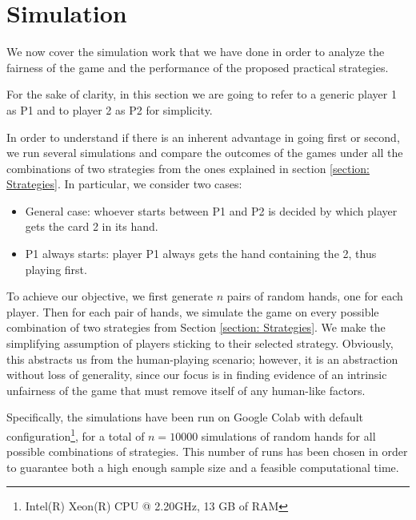 \section{Simulation}\label{section:Simulation}
We now cover the simulation work that we have done in order to analyze the fairness of the game and the performance of the proposed practical strategies.

For the sake of clarity, in this section we are going to refer to a generic player 1 as P1 and to player 2 as P2 for simplicity.

In order to understand if there is an inherent advantage in going first or second, we run several simulations and compare the outcomes of the games under all the combinations of two strategies from the ones explained in section \ref{section: Strategies}. In particular, we consider two cases:
\begin{itemize}
	\item General case: whoever starts between P1 and P2 is decided by which player gets the card 2 in its hand.
	\item P1 always starts: player P1 always gets the hand containing the 2, thus playing first.
\end{itemize}
To achieve our objective, we first generate $n$ pairs of random hands, one for each player. Then for each pair of hands, we simulate the game on every possible combination of two strategies from Section \ref{section: Strategies}.
We make the simplifying assumption of players sticking to their selected strategy. Obviously, this abstracts us from the human-playing scenario; however, it is an abstraction without loss of generality, since our focus is in finding evidence of an intrinsic unfairness of the game that must remove itself of any human-like factors.

Specifically, the simulations have been run on Google Colab with default configuration\footnote{Intel(R) Xeon(R) CPU @ 2.20GHz, 13 GB of RAM}, for a total of $n = 10000$ simulations of random hands for all possible combinations of strategies. This number of runs has been chosen in order to guarantee both a high enough sample size and a feasible computational time.




